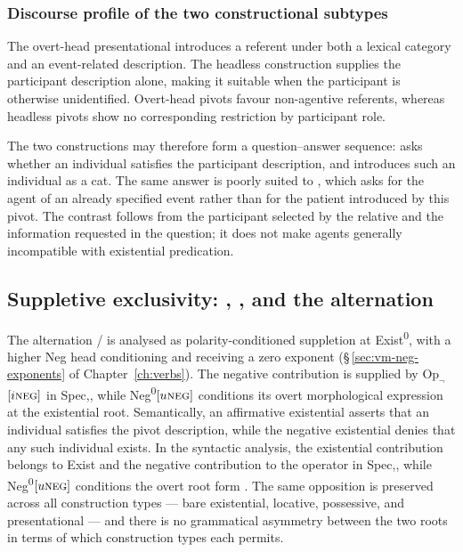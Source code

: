 \subsubsection{Discourse profile of the two constructional subtypes}
\label{sec:exst-discourse}

The overt-head presentational introduces a referent under both a lexical
category and an event-related description. The headless construction supplies
the participant description alone, making it suitable when the participant is
otherwise unidentified. Overt-head pivots favour non-agentive referents,
whereas headless pivots show no corresponding restriction by participant role.

The two constructions may therefore form a question--answer sequence:
  asks whether an
individual satisfies the participant description, and   introduces such an individual as a
cat. The same answer is poorly suited to , which asks
for the agent of an already specified event rather than for the patient
introduced by this pivot. The contrast follows from the participant selected
by the relative and the information requested in the question; it does not
make agents generally incompatible with existential predication.

\subsection{Suppletive exclusivity: , , and the  alternation}\label{sec:neg-exst-alternation}%
\label{sec:vm-jec-zad}%
\label{sec:vm-jec}

The alternation / is analysed as polarity-conditioned
suppletion at Exist\textsuperscript{0}, with a higher Neg head conditioning
 and receiving a zero exponent
(§\,\ref{sec:vm-neg-exponents} of Chapter~\ref{ch:verbs}). The negative
contribution is supplied by $\mathrm{Op}_{\neg}$$[i\textsc{neg}]$ in Spec,, while
Neg\textsuperscript{0}$[u\textsc{neg}]$ conditions its overt morphological expression at
the existential root. Semantically, an affirmative existential asserts that an individual satisfies
the pivot description, while the negative existential denies that any such
individual exists. In the syntactic analysis, the existential contribution belongs
to Exist and the negative contribution to the operator in Spec,,
while Neg\textsuperscript{0}$[u\textsc{neg}]$ conditions the overt root form .
The same opposition is preserved across all
construction types --- bare existential, locative, possessive, and
presentational --- and there is no grammatical asymmetry between the two roots
in terms of which construction types each permits.


